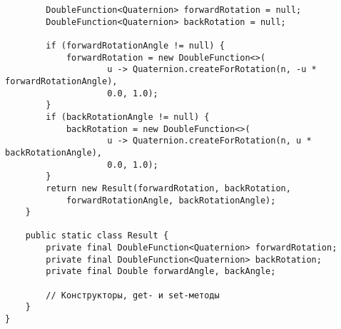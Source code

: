 \begin{verbatim}
        DoubleFunction<Quaternion> forwardRotation = null;
        DoubleFunction<Quaternion> backRotation = null;

        if (forwardRotationAngle != null) {
            forwardRotation = new DoubleFunction<>(
                    u -> Quaternion.createForRotation(n, -u * forwardRotationAngle),
                    0.0, 1.0);
        }
        if (backRotationAngle != null) {
            backRotation = new DoubleFunction<>(
                    u -> Quaternion.createForRotation(n, u * backRotationAngle),
                    0.0, 1.0);
        }
        return new Result(forwardRotation, backRotation,
            forwardRotationAngle, backRotationAngle);
    }

    public static class Result {
        private final DoubleFunction<Quaternion> forwardRotation;
        private final DoubleFunction<Quaternion> backRotation;
        private final Double forwardAngle, backAngle;

        // Конструкторы, get- и set-методы
    }
}
\end{verbatim}

